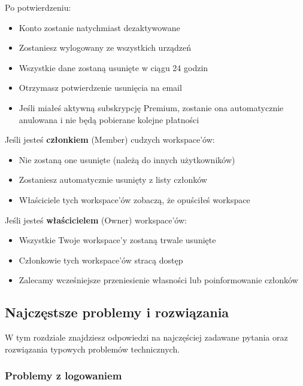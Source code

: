 \documentclass[12pt,a4paper]{article}
\begin{document}
Po potwierdzeniu:
\begin{itemize}
    \item Konto zostanie natychmiast dezaktywowane
    \item Zostaniesz wylogowany ze wszystkich urządzeń
    \item Wszystkie dane zostaną usunięte w ciągu 24 godzin
    \item Otrzymasz potwierdzenie usunięcia na email
    \item Jeśli miałeś aktywną subskrypcję Premium, zostanie ona automatycznie anulowana i nie będą pobierane kolejne płatności
\end{itemize}

\begin{tcolorbox}[colback=yellow!10!white,colframe=orange!75!black,title=\faInfoCircle\ Workspace'y współdzielone]
Jeśli jesteś \textbf{członkiem} (Member) cudzych workspace'ów:
\begin{itemize}
    \item Nie zostaną one usunięte (należą do innych użytkowników)
    \item Zostaniesz automatycznie usunięty z listy członków
    \item Właściciele tych workspace'ów zobaczą, że opuściłeś workspace
\end{itemize}

Jeśli jesteś \textbf{właścicielem} (Owner) workspace'ów:
\begin{itemize}
    \item Wszystkie Twoje workspace'y zostaną trwale usunięte
    \item Członkowie tych workspace'ów stracą dostęp
    \item Zalecamy wcześniejsze przeniesienie własności lub poinformowanie członków
\end{itemize}
\end{tcolorbox}

\subsection{Najczęstsze problemy i rozwiązania}

W tym rozdziale znajdziesz odpowiedzi na najczęściej zadawane pytania oraz rozwiązania typowych problemów technicznych.

\subsubsection{Problemy z logowaniem}
\end{document}
